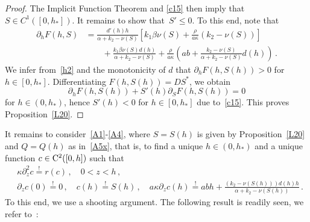 \documentclass[reqno,11pt]{amsart}
\numberwithin{equation}{section}
\begin{document}
\begin{proof}
The Implicit Function Theorem and \eqref{c15} then imply that $S\in C^1([0,h_*])$. It remains to show that~$S'\le 0$.
To this end, note  that
\begin{align*}
\partial_h F(h,S)&=\frac{d'(h)h}{\alpha+k_2-\nu(S)} \left[ k_1\beta\nu(S)+\frac{\rho}{a\kappa}(k_2-\nu(S))\right]\\
&\qquad +\frac{k_1\beta \nu(S)d(h)}{\alpha+k_2-\nu(S)} +\frac{\rho}{a\kappa}\left( ab+\frac{k_2-\nu(S)}{\alpha+k_2-\nu(S)}d(h)\right) \,.
\end{align*}
We infer from~\eqref{h2} and the monotonicity of $d$ that $\partial_h F(h,S(h))>0$ for $h\in [0,h_*]$. Differentiating $F(h,S(h))=DS^*$, we obtain
$$
\partial_h F(h,S(h))+S'(h)\partial_SF(h,S(h))=0
$$
for $h\in (0,h_*)$, hence $S'(h) <0$ for $h\in [0,h_*]$ due to~\eqref{c15}. This proves Proposition~\ref{L20}.
\end{proof}





It remains to consider~\eqref{A1}-\eqref{A4}, where $S=S(h)$ is given by Proposition~\ref{L20} and \mbox{$Q=Q(h)$} as in~\eqref{A5x}, that is, to find a unique $h\in (0,h_*)$ and a unique function \mbox{$c \in {\rm C}^2([0,h])$} such that
\begin{subequations}\label{eq}
\begin{align}
&\kappa\partial_z^2 c\stackrel{!}{=}r(c)\,, \quad 0<z<h\,, \label{A1s}\\
&\partial_z c(0)\stackrel{!}{=}0\,,\quad
 c(h)\stackrel{!}{=}S(h)\,,\quad
a\kappa \partial_z c(h)\stackrel{!}{=}abh+\frac{(k_2-\nu(S(h)))d(h)h}{\alpha+k_2-\nu(S(h))}\,. \label{A4s}
\end{align}
\end{subequations}
To this end, we use a shooting argument. The following result is readily seen, we refer to~\cite[Lemma~3.7]{GW_QAM}:
\end{document}

